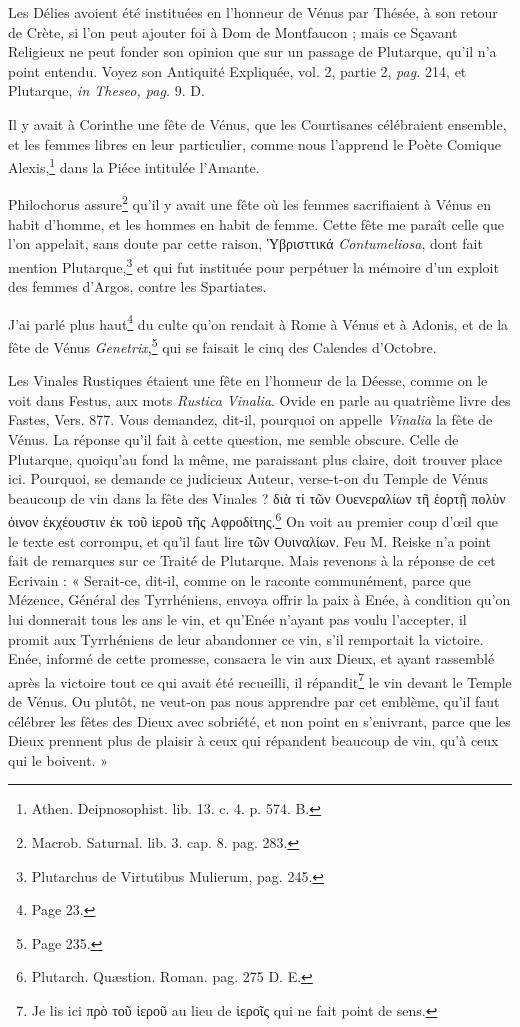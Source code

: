 \documentclass[a4paper, 18pt, oneside]{article}
\begin{document}
Les Délies avoient été instituées en l'honneur de Vénus par Thésée, à son retour de Crète, si l'on peut ajouter foi à Dom de Montfaucon ; mais ce Sçavant Religieux ne peut fonder son opinion que sur un passage de Plutarque, qu'il n'a point entendu. Voyez son Antiquité Expliquée, vol. 2, partie 2, \emph{pag.} 214, et Plutarque, \emph{in Theseo, pag.} 9. D.

Il y avait à Corinthe une fête de Vénus, que les Courtisanes célébraient ensemble, et les femmes libres en leur particulier, comme nous l'apprend le Poète Comique Alexis,\footnote{Athen. Deipnosophist. lib. 13. c. 4. p. 574. B.} dans la Piéce intitulée l'Amante.

Philochorus assure\footnote{Macrob. Saturnal. lib. 3. cap. 8. pag. 283.} qu'il y avait une fête où les femmes sacrifiaient à Vénus en habit d'homme, et les hommes en habit de femme. Cette fête me paraît celle que l'on appelait, sans doute par cette raison, Ὑβρισττικά \emph{Contumeliosa}, dont fait mention Plutarque,\footnote{Plutarchus de Virtutibus Mulierum, pag. 245.} et qui fut instituée pour perpétuer la mémoire d'un exploit des femmes d'Argos, contre les Spartiates.

J'ai parlé plus haut\footnote{Page 23.} du culte qu'on rendait à Rome à Vénus et à Adonis, et de la fête de Vénus \emph{Genetrix},\footnote{Page 235.} qui se faisait le cinq des Calendes d'Octobre.

Les Vinales Rustiques étaient une fête en l'honneur de la Déesse, comme on le voit dans Festus, aux mots \emph{Rustica Vinalia}. Ovide en parle au quatrième livre des Fastes, Vers. 877. Vous demandez, dit-il, pourquoi on appelle \emph{Vinalia} la fête de Vénus. La réponse qu'il fait à cette question, me semble obscure. Celle de Plutarque, quoiqu'au fond la même, me paraissant plus claire, doit trouver place ici. Pourquoi, se demande ce judicieux Auteur, verse-t-on du Temple de Vénus beaucoup de vin dans la fête des Vinales ? διὰ τί τῶν Ουενεραλίων τῆ ἑορτῇ πολὺν ὀινον ἐκχέουστιν ἐκ τοῦ ἱεροῦ τῆς Αφροδίτης.\footnote{Plutarch. Quæstion. Roman. pag. 275 D. E.} On voit au premier coup d'œil que le texte est corrompu, et qu'il faut lire τῶν Ουιναλίων. Feu M. Reiske n'a point fait de remarques sur ce Traité de Plutarque. Mais revenons à la réponse de cet Ecrivain : « Serait-ce, dit-il, comme on le raconte communément, parce que Mézence, Général des Tyrrhéniens, envoya offrir la paix à Enée, à condition qu'on lui donnerait tous les ans le vin, et qu'Enée n'ayant pas voulu l'accepter, il promit aux Tyrrhéniens de leur abandonner ce vin, s'il remportait la victoire. Enée, informé de cette promesse, consacra le vin aux Dieux, et ayant rassemblé après la victoire tout ce qui avait été recueilli, il répandit\footnote{Je lis ici πρὸ τοῦ ἱεροῦ au lieu de ἱεροῖς qui ne fait point de sens.} le vin devant le Temple de Vénus. Ou plutôt, ne veut-on pas nous apprendre par cet emblème, qu'il faut célébrer les fêtes des Dieux avec sobriété, et non point en s'enivrant, parce que les Dieux prennent plus de plaisir à ceux qui répandent beaucoup de vin, qu'à ceux qui le boivent. »
\end{document}
